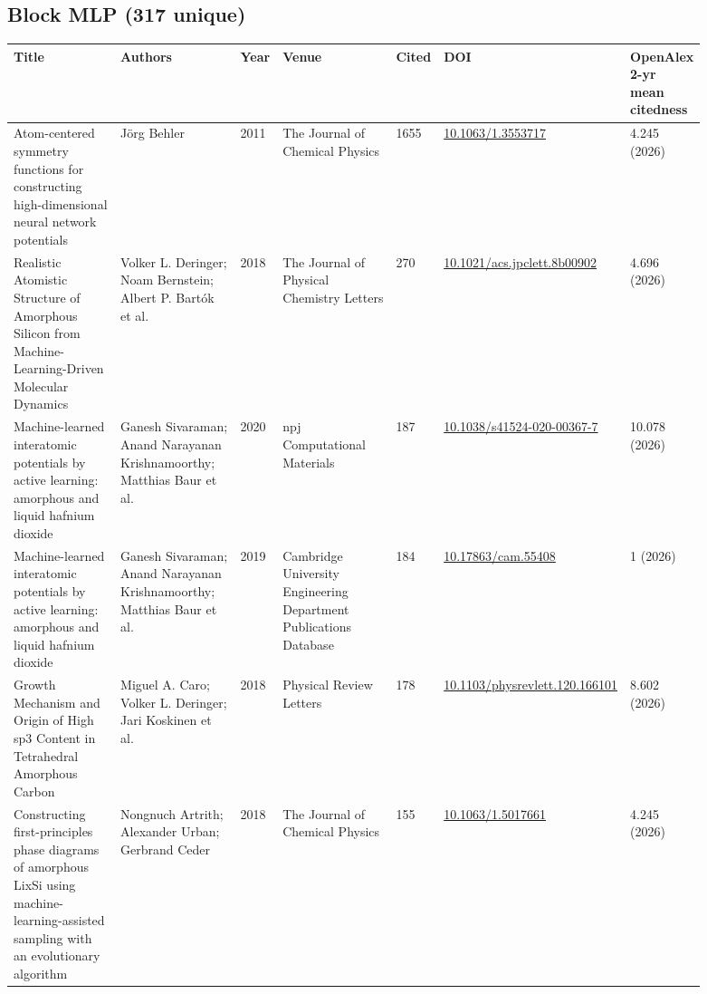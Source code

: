 \documentclass[10pt,a4paper]{article}
\begin{document}
\subsection*{Block MLP (317 unique)}
{\scriptsize\begin{longtable}{p{0.200\linewidth}p{0.200\linewidth}p{0.043\linewidth}p{0.200\linewidth}p{0.043\linewidth}p{0.106\linewidth}p{0.100\linewidth}}
\hline
\textbf{Title} & \textbf{Authors} & \textbf{Year} & \textbf{Venue} & \textbf{Cited} & \textbf{DOI} & \textbf{OpenAlex 2-yr mean citedness} \\ \hline
\endhead
Atom-centered symmetry functions for constructing high-dimensional neural network potentials & Jörg Behler & 2011 & The Journal of Chemical Physics & 1655 & \href{https://doi.org/10.1063/1.3553717}{10.1063/1.3553717} & 4.245 (2026) \\
Realistic Atomistic Structure of Amorphous Silicon from Machine-Learning-Driven Molecular Dynamics & Volker L. Deringer; Noam Bernstein; Albert P. Bartók et al. & 2018 & The Journal of Physical Chemistry Letters & 270 & \href{https://doi.org/10.1021/acs.jpclett.8b00902}{10.1021/acs.jpclett.8b00902} & 4.696 (2026) \\
Machine-learned interatomic potentials by active learning: amorphous and liquid hafnium dioxide & Ganesh Sivaraman; Anand Narayanan Krishnamoorthy; Matthias Baur et al. & 2020 & npj Computational Materials & 187 & \href{https://doi.org/10.1038/s41524-020-00367-7}{10.1038/s41524-020-00367-7} & 10.078 (2026) \\
Machine-learned interatomic potentials by active learning: amorphous and liquid hafnium dioxide & Ganesh Sivaraman; Anand Narayanan Krishnamoorthy; Matthias Baur et al. & 2019 & Cambridge University Engineering Department Publications Database & 184 & \href{https://doi.org/10.17863/cam.55408}{10.17863/cam.55408} & 1 (2026) \\
Growth Mechanism and Origin of High sp3 Content in Tetrahedral Amorphous Carbon & Miguel A. Caro; Volker L. Deringer; Jari Koskinen et al. & 2018 & Physical Review Letters & 178 & \href{https://doi.org/10.1103/physrevlett.120.166101}{10.1103/physrevlett.120.166101} & 8.602 (2026) \\
Constructing first-principles phase diagrams of amorphous LixSi using machine-learning-assisted sampling with an evolutionary algorithm & Nongnuch Artrith; Alexander Urban; Gerbrand Ceder & 2018 & The Journal of Chemical Physics & 155 & \href{https://doi.org/10.1063/1.5017661}{10.1063/1.5017661} & 4.245 (2026) \\

\end{longtable}}
\end{document}
